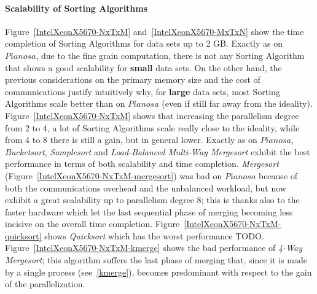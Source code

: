 \paragraph{Scalability of Sorting Algorithms} Figure~\ref{IntelXeonX5670-NxTxM} and~\ref{IntelXeonX5670-MxTxN} show the time completion of Sorting Algorithms for data sets up to 2 GB. Exactly as on $Pianosa$, due to the fine grain computation, there is not any Sorting Algorithm that shows a good scalability for \textbf{small} data sets. On the other hand, the previous considerations on the primary memory size and the cost of communications justify intuitively why, for \textbf{large} data sets, most Sorting Algorithms scale better than on $Pianosa$ (even if still far away from the ideality). Figure~\ref{IntelXeonX5670-NxTxM} shows that increasing the parallelism degree from 2 to 4, a lot of Sorting Algorithms scale really close to the ideality, while from 4 to 8 there is still a gain, but in general lower. Exactly as on $Pianosa$, \textit{Bucketsort}, \textit{Samplesort} and \textit{Load-Balanced Multi-Way Mergesort} exhibit the best performance in terms of both scalability and time completion. \textit{Mergesort} (Figure~\ref{IntelXeonX5670-NxTxM-mergesort}) was bad on $Pianosa$ because of both the communications overhead and the unbalanced workload, but now exhibit a great scalability up to parallelism degree 8; this is thanks also to the faster hardware which let the last sequential phase of merging becoming less incisive on the overall time completion. Figure~\ref{IntelXeonX5670-NxTxM-quicksort} shows \textit{Quicksort} which has the worst performance TODO. Figure~\ref{IntelXeonX5670-NxTxM-kmerge} shows the bad performance of \textit{4-Way Mergesort}; this algorithm suffers the last phase of merging that, since it is made by a single process (see~\ref{kmerge}), becomes predominant with respect to the gain of the parallelization. 

